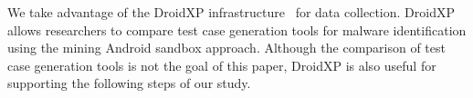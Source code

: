 We take advantage of the DroidXP infrastructure~\cite{DBLP:conf/scam/CostaMCMVBC20}
for data collection. DroidXP allows researchers to compare 
test case generation tools for malware identification using the
mining Android sandbox approach. Although the comparison of test
case generation tools is not the goal of this paper, DroidXP
is also useful for supporting the following steps of our study.


